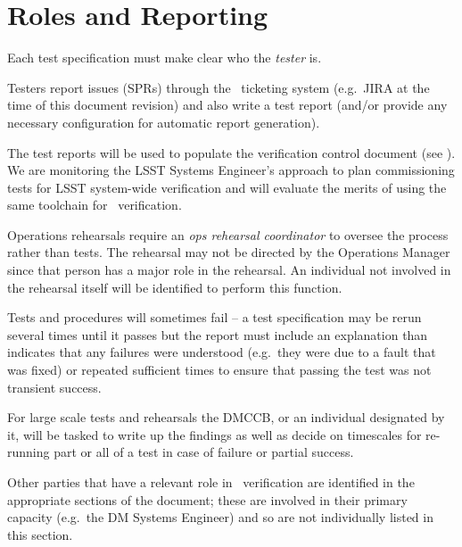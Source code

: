 

\section{Roles and Reporting}

Each test specification must make clear who the \emph{tester} is.

Testers report issues (SPRs) through the \product\ ticketing system (e.g.\ JIRA at the time of this document revision) and also write a test report (and/or provide any necessary configuration for automatic report generation).

The test reports will be used to populate the verification control document (see ). We are monitoring the LSST Systems Engineer's approach to plan commissioning tests for LSST system-wide verification and will evaluate the merits of using the same toolchain for \product\ verification.

Operations rehearsals require an \emph{ops rehearsal coordinator} to oversee the process rather than tests. The rehearsal may not be directed by the Operations Manager since that person has a major role in the rehearsal. An individual not involved in the rehearsal itself will be identified to perform this function.

Tests and procedures will sometimes fail -- a test specification may be rerun several times until it passes but the report must include an explanation than indicates that any failures were understood (e.g.\ they were due to a fault that was fixed) or repeated sufficient times to ensure that passing the test was not transient success.

For large scale tests and rehearsals the DMCCB, or an individual designated by it, will be tasked to write up the findings as well as decide on timescales for re-running part or all of a test in case of failure or partial success.

Other parties that have a relevant role in \product\ verification are identified in the appropriate sections of the document; these are involved in their primary capacity (e.g.\ the DM Systems Engineer) and so are not individually listed in this section.
